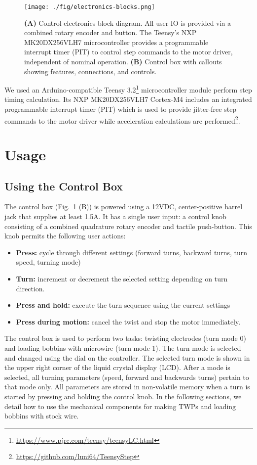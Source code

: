 \documentclass[11pt,a4paper]{article}
\begin{document}
\begin{figure}
\centering
\texttt{[image: ./fig/electronics-blocks.png]}
\caption{\textbf{(A)} Control electronics block diagram. All user IO is
    provided via a combined rotary encoder and button. The Teensy's NXP
    MK20DX256VLH7 microcontroller provides a  programmable interrupt timer
    (PIT) to control step commands to the motor driver, independent of nominal
    operation.
    \textbf{(B)} Control box with callouts showing features, connections, and
    controls.}
\label{f:ctrl-box}
\end{figure}

We used an Arduino-compatible Teensy
3.2\footnote{\url{https://www.pjrc.com/teensy/teensyLC.html}} microcontroller
module perform step timing calculation. Its NXP MK20DX256VLH7 Cortex-M4
includes an integrated programmable interrupt timer (PIT) which is used to
provide jitter-free step commands to the motor driver while acceleration
calculations are
performed\footnote{\url{https://github.com/luni64/TeensyStep}}.

\section{Usage}

\subsection{Using the Control Box}
The control box (Fig.~\ref{f:ctrl-box} (B)) is powered using a 12VDC,
center-positive barrel jack that supplies at least 1.5A. It has a single user
input: a control knob consisting of a combined quadrature rotary encoder and
tactile push-button. This knob permits the following user actions:

\begin{itemize}[noitemsep]
    \item \textbf{Press:} cycle through different settings (forward turns,
        backward turns, turn speed, turning mode)
    \item \textbf{Turn:} increment or decrement the selected setting
        depending on turn direction.
    \item \textbf{Press and hold:} execute the turn sequence using the
        current settings
    \item \textbf{Press during motion:} cancel the twist and stop the motor
        immediately.
\end{itemize}

The control box is used to perform two tasks: twisting electrodes (turn mode 0)
and loading bobbins with microwire (turn mode 1). The turn mode is selected and
changed using the dial on the controller. The selected turn mode is shown in
the upper right corner of the liquid crystal display (LCD). After a mode is
selected, all turning parameters (speed, forward and backwards turns) pertain
to that mode only. All parameters are stored in non-volatile memory when a turn
is started by pressing and holding the control knob. In the following sections,
we detail how to use the mechanical components for making TWPs and loading
bobbins with stock wire.
\end{document}
